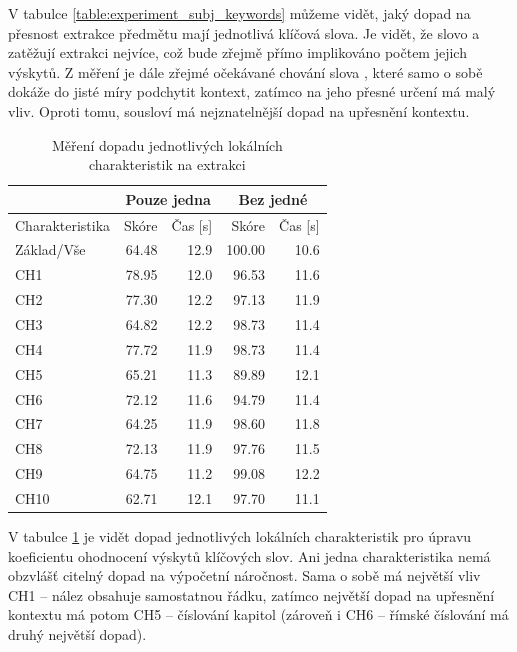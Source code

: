 \documentclass[thesis=M,czech]{FITthesis}[2019/12/23]
\begin{document}
V tabulce \ref{table:experiment_subj_keywords} můžeme vidět, jaký dopad na přesnost extrakce předmětu mají jednotlivá klíčová slova. Je vidět, že slovo  a  zatěžují extrakci nejvíce, což bude zřejmě přímo implikováno počtem jejich výskytů. Z měření je dále zřejmé očekávané chování slova , které samo o sobě dokáže do jisté míry podchytit kontext, zatímco na jeho přesné určení má malý vliv. Oproti tomu, sousloví  má nejznatelnější dopad na upřesnění kontextu.

\begin{table}[h!]
\centering
\begin{tabular}{ |l|r|r|r|r| }
\hline
 & \multicolumn{2}{|c|}{Pouze jedna} & \multicolumn{2}{|c|}{Bez jedné} \\\hline
Charakteristika & Skóre & Čas [s] & Skóre & Čas [s] \\\hline
\hline
Základ/Vše & 64.48 & 12.9 & 100.00 & 10.6\\\hline
CH1 & 78.95 & 12.0 & 96.53 & 11.6\\
CH2 & 77.30 & 12.2 & 97.13 & 11.9\\
CH3 & 64.82 & 12.2 & 98.73 & 11.4\\
CH4 & 77.72 & 11.9 & 98.73 & 11.4\\
CH5 & 65.21 & 11.3 & 89.89 & 12.1\\\hline
CH6 & 72.12 & 11.6 & 94.79& 11.4\\
CH7 & 64.25 & 11.9 & 98.60 & 11.8\\
CH8 & 72.13 & 11.9 & 97.76 & 11.5\\
CH9 & 64.75 & 11.2 & 99.08 & 12.2\\
CH10 & 62.71 & 12.1 & 97.70 & 11.1\\\hline
\end{tabular}
\caption{Měření dopadu jednotlivých lokálních charakteristik na extrakci}
\label{table:experiment_characteristics}
\end{table}

V tabulce \ref{table:experiment_characteristics} je vidět dopad jednotlivých lokálních charakteristik pro úpravu koeficientu ohodnocení výskytů klíčových slov. Ani jedna charakteristika nemá obzvlášť citelný dopad na výpočetní náročnost. Sama o sobě má největší vliv CH1 -- nález obsahuje samostatnou řádku, zatímco největší dopad na upřesnění kontextu má potom CH5 -- číslování kapitol (zároveň i CH6 -- římské číslování má druhý největší dopad).
\end{document}
